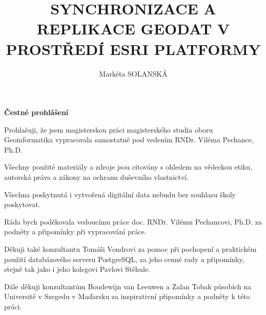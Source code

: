 \documentclass{thesisKGI}
\title{SYNCHRONIZACE A REPLIKACE GEODAT V PROSTŘEDÍ ESRI PLATFORMY}
\author{Markéta SOLANSKÁ}
\begin{document}
    \sloppy       %
    \maketitle    %


    \begin{declaration}
      \textbf{Čestné prohlášení}

      Prohlašuji, že jsem magisterskou práci magisterského studia oboru Geoinformatika vypracovala samostatně pod vedením RNDr. Viléma Pechance, Ph.D.

      Všechny použité materiály a zdroje jsou citovány s ohledem na vědeckou etiku, autorská práva a zákony na ochranu duševního vlastnictví.

      Všechna poskytnutá i vytvořená digitální data nebudu bez souhlasu školy poskytovat.
    \end{declaration}

    
    \begin{dedication}

      Ráda bych poděkovala vedoucímu práce doc. RNDr. Vilému Pechancovi, Ph.D. za podněty a připomínky při vypracování práce.

      Děkuji také konzultantu Tomáši Vondrovi za pomoc při pochopení a praktickém použití databázového serveru PostgreSQL, za jeho cenné rady a připomínky, stejně tak jako i jeho kolegovi Pavlovi Stěhule.

      Dále děkuji konzultantům Boudewijn van Leeuwen a Zalan Tobak působích na Universitě v Szegedu v Maďarsku za inspirativní připomínky a podněty k této práci. 
      \vspace{4em}
    \end{dedication}

    
    \setcounter{page}{5}          %
\end{document}
